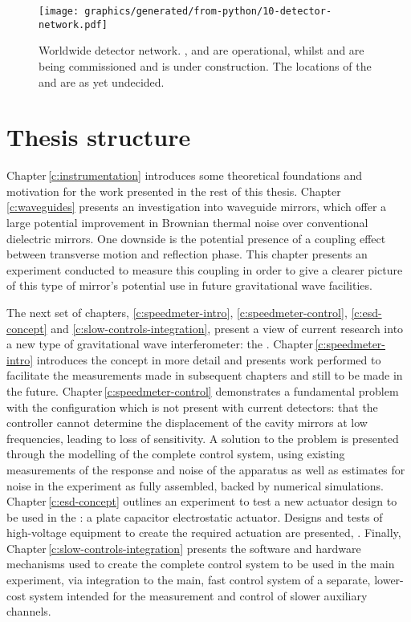 
\begin{figure}
  \centering
  \texttt{[image: graphics/generated/from-python/10-detector-network.pdf]}
  \caption[Worldwide detector network]{Worldwide detector network. \GEO{}, \LHO{} and \LLO{} are operational, whilst \VIRGO{} and \KAGRA{} are being commissioned and \INDIGO{} is under construction. The locations of the \ET{} and \LIGOCE{} are as yet undecided.}
\end{figure}

\section{Thesis structure}
Chapter\,\ref{c:instrumentation} introduces some theoretical foundations and motivation for the work presented in the rest of this thesis. Chapter\,\ref{c:waveguides} presents an investigation into waveguide mirrors, which offer a large potential improvement in Brownian thermal noise over conventional dielectric mirrors. One downside is the potential presence of a coupling effect between transverse motion and reflection phase. This chapter presents an experiment conducted to measure this coupling in order to give a clearer picture of this type of mirror's potential use in future gravitational wave facilities.

The next set of chapters, \ref{c:speedmeter-intro}, \ref{c:speedmeter-control}, \ref{c:esd-concept} and \ref{c:slow-controls-integration}, present a view of current research into a new type of gravitational wave interferometer: the \SSM{}. Chapter\,\ref{c:speedmeter-intro} introduces the concept in more detail and presents work performed to facilitate the measurements made in subsequent chapters and still to be made in the future. Chapter\,\ref{c:speedmeter-control} demonstrates a fundamental problem with the \SSM{} configuration which is not present with current detectors: that the controller cannot determine the displacement of the cavity mirrors at low frequencies, leading to loss of sensitivity. A solution to the problem is presented through the modelling of the complete control system, using existing measurements of the response and noise of the apparatus as well as estimates for noise in the experiment as fully assembled, backed by numerical simulations. Chapter\,\ref{c:esd-concept} outlines an experiment to test a new actuator design to be used in the \SSMEXPT{}: a plate capacitor electrostatic actuator. Designs and tests of high-voltage equipment to create the required actuation are presented, . Finally, Chapter\,\ref{c:slow-controls-integration} presents the software and hardware mechanisms used to create the complete control system to be used in the main experiment, via integration to the main, fast control system of a separate, lower-cost system intended for the measurement and control of slower auxiliary channels.

